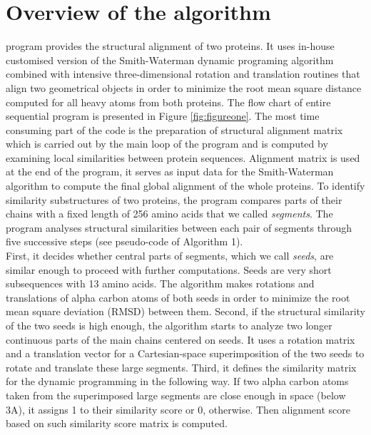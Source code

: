 \section{Overview of the algorithm}
\prog{} program provides the structural alignment of two proteins.
It uses in-house customised version of the Smith-Waterman dynamic programing
algorithm combined with intensive three-dimensional rotation and translation
routines that align two geometrical objects in order to minimize the root mean square
distance computed for all heavy atoms from both proteins.
The flow chart of entire sequential program is presented in Figure \ref{fig:figureone}.
The most time consuming part of the code is the preparation of structural
alignment matrix which is carried out by the main loop of the program and is computed by examining local similarities between protein sequences. Alignment matrix is used at the end of the program, it serves as input data for the Smith-Waterman algorithm to compute the final global alignment of the whole proteins. 
To identify similarity substructures of two proteins, the program compares
parts of their chains with a fixed length of 256 amino acids
that we called \emph{segments}.
The \prog{} program analyses structural similarities between each pair of segments through five successive steps (see pseudo-code of Algorithm 1).\\
First, it decides whether central parts of segments, which we call
\emph{seeds}, are similar enough to proceed with further computations.
Seeds are very short subsequences with 13 amino acids.
The \prog{} algorithm makes rotations and translations of alpha carbon atoms of both seeds in
order to minimize the root mean square deviation (RMSD) between them.
Second, if the structural similarity of the two seeds is high enough,
the algorithm starts to analyze two longer continuous parts of the main chains
centered on seeds.
It uses a rotation matrix and a translation vector for a Cartesian-space
superimposition of the two seeds to rotate and translate these large segments.
Third, it defines the similarity matrix for the dynamic programming in the
following way.
If two alpha carbon atoms taken from the superimposed large segments are close enough
in space (below 3A), it assigns 1 to their similarity score or 0, otherwise.
Then alignment score based on such similarity score matrix is computed.
